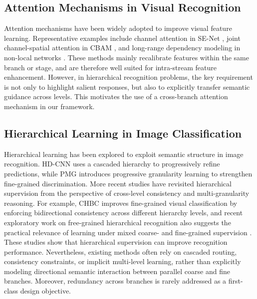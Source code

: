 \documentclass[pdflatex,iicol,sn-mathphys-num]{sn-jnl}
\theoremstyle{thmstyleone}%
\theoremstyle{thmstyletwo}%
\theoremstyle{thmstylethree}%
\begin{document}
\subsection{Attention Mechanisms in Visual Recognition}
Attention mechanisms have been widely adopted to improve visual feature learning. 
Representative examples include channel attention in SE-Net \cite{hu2018squeeze}, joint channel-spatial attention in CBAM \cite{woo2018cbam}, and long-range dependency modeling in non-local networks \cite{nonlocal}. 
These methods mainly recalibrate features within the same branch or stage, and are therefore well suited for intra-stream feature enhancement. 
However, in hierarchical recognition problems, the key requirement is not only to highlight salient responses, but also to explicitly transfer semantic guidance across levels. 
This motivates the use of a cross-branch attention mechanism in our framework.

\subsection{Hierarchical Learning in Image Classification}
Hierarchical learning has been explored to exploit semantic structure in image recognition. 
HD-CNN \cite{yan2015hdcnn} uses a cascaded hierarchy to progressively refine predictions, while PMG \cite{du2020fine} introduces progressive granularity learning to strengthen fine-grained discrimination. 
More recent studies have revisited hierarchical supervision from the perspective of cross-level consistency and multi-granularity reasoning. 
For example, CHBC \cite{gao2025chbc} improves fine-grained visual classification by enforcing bidirectional consistency across different hierarchy levels, and recent exploratory work on free-grained hierarchical recognition also suggests the practical relevance of learning under mixed coarse- and fine-grained supervision \cite{park2025freegrained}. 
These studies show that hierarchical supervision can improve recognition performance. 
Nevertheless, existing methods often rely on cascaded routing, consistency constraints, or implicit multi-level learning, rather than explicitly modeling directional semantic interaction between parallel coarse and fine branches. 
Moreover, redundancy across branches is rarely addressed as a first-class design objective.
\end{document}
